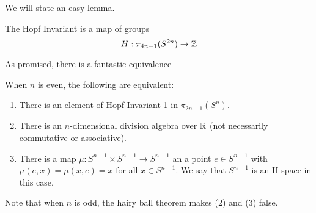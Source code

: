 We will state an easy lemma.  
\begin{Lemma}
  The Hopf Invariant is a map of groups 
  \[H:\pi_{4n-1}(S^{2n})\to \mathbb{Z}\]
\end{Lemma}


As promised, there is a fantastic equivalence
\begin{Theorem}
  When $n$ is even, the following are equivalent:
  \begin{enumerate}
    \item There is an element of Hopf Invariant 1 in $\pi_{2n-1}(S^n)$.
    \item There is an $n$-dimensional division algebra over $\mathbb{R}$ (not necessarily commutative or associative).
    \item There is a map $\mu:S^{n-1}\times S^{n-1}\to S^{n-1}$ an a point $e\in S^{n-1}$ with $\mu(e,x)=\mu(x,e)=x$ for all $x\in S^{n-1}$.  We say that $S^{n-1}$ is an H-space in this case. 
  \end{enumerate}
\end{Theorem}
Note that when $n$ is odd, the hairy ball theorem makes (2) and (3) false.  

